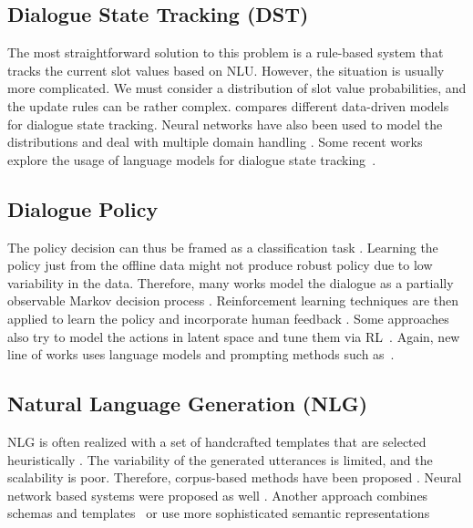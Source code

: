 \subsection{Dialogue State Tracking (DST)} 
\label{relwork:DST}
The most straightforward solution to this problem is a rule-based system that tracks the current slot values based on NLU.
However, the situation is usually more complicated.
We must consider a distribution of slot value probabilities, and the update rules can be rather complex.
\citet{vzilka2013comparison} compares different data-driven models for dialogue state tracking.
Neural networks have also been used to model the distributions \cite{mrkvsic2016neural, zhong2018global} and deal with multiple domain handling \cite{rastogi2017scalable}.
Some recent works explore the usage of language models for dialogue state tracking~\cite{lee-etal-2021-dialogue, hu2022context}.

\subsection{Dialogue Policy}
\label{relwork:policy}
The policy decision can thus be framed as a classification task \cite{gavsic2013gaussian}.
Learning the policy just from the offline data might not produce robust policy due to low variability in the data.
Therefore, many works model the dialogue as a partially observable Markov decision process \cite{gavsic2010gaussian, thomson2010bayesian}.
Reinforcement learning techniques are then applied to learn the policy and incorporate human feedback \cite{peng2017composite, su2016line}.
Some approaches also try to model the actions in latent space and tune them via RL~\cite{lubis-etal-2022-dialogue}.
Again, new line of works uses language models and prompting methods such as~\citet{zhang2023sgp}.
\subsection{Natural Language Generation (NLG)}
NLG is often realized with a set of handcrafted templates that are selected heuristically \cite{rudnicky_creating_1999}.
The variability of the generated utterances is limited, and the scalability is poor.
Therefore, corpus-based methods have been proposed \cite{oh2000stochastic, mairesse-young-2014-stochastic}.
Neural network based systems were proposed as well \cite{wen-etal-2015-semantically, wen-etal-2016-multi}.
Another approach combines schemas and templates~\citep{kale-rastogi-2020-template} or use more sophisticated semantic representations~\citep{balakrishnan-etal-2019-constrained} 

